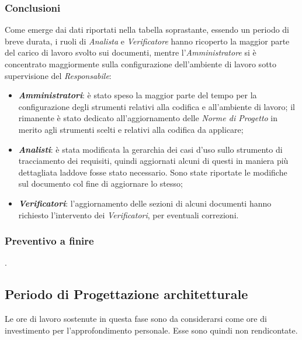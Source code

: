\subsubsection{Conclusioni}
Come emerge dai dati riportati nella tabella soprastante, essendo un periodo di breve durata, i ruoli di \textit{Analista} e \textit{Verificatore} hanno ricoperto la maggior parte del carico di lavoro svolto sui documenti, mentre l'\textit{Amministratore} si è concentrato maggiormente sulla configurazione dell'ambiente di lavoro sotto supervisione del \textit{Responsabile}:
\begin{itemize}
	\item \textbf{\textit{Amministratori}}: è stato speso la maggior parte del tempo per la configurazione degli strumenti relativi alla codifica e all'ambiente di lavoro; il rimanente è stato dedicato all'aggiornamento delle \textit{Norme di Progetto} in merito agli strumenti scelti e relativi alla codifica da applicare;
	\item \textbf{\textit{Analisti}}: è stata modificata la gerarchia dei casi d'uso sullo strumento di tracciamento dei requisiti, quindi aggiornati alcuni di questi in maniera più dettagliata laddove fosse stato necessario. Sono state riportate le modifiche sul documento col fine di aggiornare lo stesso;
	\item \textbf{\textit{Verificatori}}: l'aggiornamento delle sezioni di alcuni documenti hanno richiesto l'intervento dei \textit{Verificatori}, per eventuali correzioni. 
\end{itemize}

\subsubsection{Preventivo a finire} 
.

\subsection{Periodo di Progettazione architetturale}
Le ore di lavoro sostenute in questa fase sono da considerarsi come ore di investimento per l'approfondimento personale. Esse sono quindi non rendicontate.

